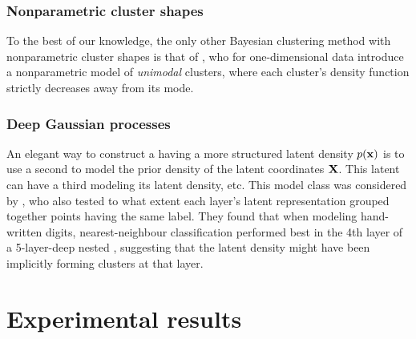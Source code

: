 
\subsubsection{Nonparametric cluster shapes}

To the best of our knowledge, the only other Bayesian clustering method with nonparametric cluster shapes is that of \citet{rodriguez2012univariate}, who for one-dimensional data introduce a nonparametric model of \emph{unimodal} clusters, where each cluster's density function strictly decreases away from its mode.


\subsubsection{Deep Gaussian processes}

An elegant way to construct a \gplvm{} having a more structured latent density $p({\bf{x}})$ is to use a second \gplvm{} to model the prior density of the latent coordinates $\mathbf{X}$.
This latent \gplvm{} can have a third \gplvm{} modeling its latent density, etc.
This model class was considered by \citet{damianou2012deep}, who also tested to what extent each layer's latent representation grouped together points having the same label.
They found that when modeling \MNIST{} hand-written digits, nearest-neighbour classification performed best in the 4th layer of a 5-layer-deep nested \gplvm{}, suggesting that the latent density might have been implicitly forming clusters at that layer.


\section{Experimental results}
\label{sec:iwmm-experiments}

